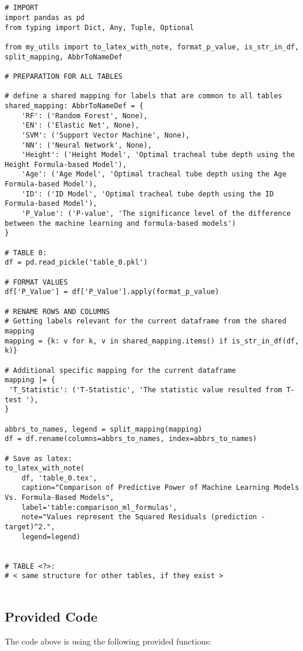 \documentclass[11pt]{article}
\begin{document}
\begin{verbatim}


# IMPORT
import pandas as pd
from typing import Dict, Any, Tuple, Optional

from my_utils import to_latex_with_note, format_p_value, is_str_in_df, split_mapping, AbbrToNameDef

# PREPARATION FOR ALL TABLES

# define a shared mapping for labels that are common to all tables
shared_mapping: AbbrToNameDef = {
    'RF': ('Random Forest', None),
    'EN': ('Elastic Net', None),
    'SVM': ('Support Vector Machine', None),
    'NN': ('Neural Network', None),
    'Height': ('Height Model', 'Optimal tracheal tube depth using the Height Formula-based Model'),
    'Age': ('Age Model', 'Optimal tracheal tube depth using the Age Formula-based Model'),
    'ID': ('ID Model', 'Optimal tracheal tube depth using the ID Formula-based Model'),
    'P_Value': ('P-value', 'The significance level of the difference between the machine learning and formula-based models')
}

# TABLE 0:
df = pd.read_pickle('table_0.pkl')

# FORMAT VALUES 
df['P_Value'] = df['P_Value'].apply(format_p_value)

# RENAME ROWS AND COLUMNS 
# Getting labels relevant for the current dataframe from the shared mapping
mapping = {k: v for k, v in shared_mapping.items() if is_str_in_df(df, k)} 

# Additional specific mapping for the current dataframe
mapping |= {
 'T_Statistic': ('T-Statistic', 'The statistic value resulted from T-test '),
}

abbrs_to_names, legend = split_mapping(mapping)
df = df.rename(columns=abbrs_to_names, index=abbrs_to_names)

# Save as latex:
to_latex_with_note(
    df, 'table_0.tex',
    caption="Comparison of Predictive Power of Machine Learning Models Vs. Formula-Based Models", 
    label='table:comparison_ml_formulas',
    note="Values represent the Squared Residuals (prediction - target)^2.",
    legend=legend)


# TABLE <?>:
# < same structure for other tables, if they exist > 


\end{verbatim}

\subsection{Provided Code}
The code above is using the following provided functions:
\end{document}
